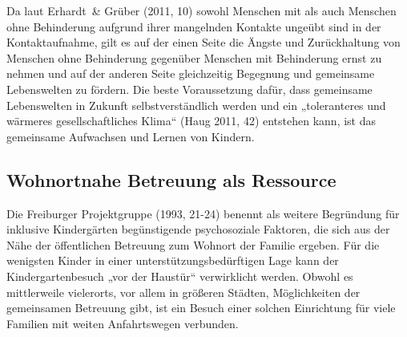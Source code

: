 Da laut Erhardt~\& Grüber (2011, 10) sowohl Menschen mit als auch Menschen ohne Behinderung aufgrund ihrer mangelnden Kontakte ungeübt sind in der Kontaktaufnahme, gilt es auf der einen Seite die Ängste und Zurückhaltung von Menschen ohne Behinderung gegenüber Menschen mit Behinderung ernst zu nehmen und auf der anderen Seite gleichzeitig Begegnung und gemeinsame Lebenswelten zu fördern. Die beste Voraussetzung dafür, dass gemeinsame Lebenswelten in Zukunft selbstverständlich werden und ein „toleranteres und wärmeres gesellschaftliches Klima“ (Haug 2011, 42) entstehen kann, ist das gemeinsame Aufwachsen und Lernen von Kindern. 

\subsection{Wohnortnahe Betreuung als Ressource}
Die Freiburger Projektgruppe (1993, 21-24) benennt als weitere Begründung für inklusive Kindergärten begünstigende psychosoziale Faktoren, die sich aus der Nähe der öffentlichen Betreuung zum Wohnort der Familie ergeben. Für die wenigsten Kinder in einer unterstützungsbedürftigen Lage kann der Kindergartenbesuch „vor der Haustür“ verwirklicht werden. Obwohl es mittlerweile vielerorts, vor allem in größeren Städten, Möglichkeiten der gemeinsamen Betreuung gibt, ist ein Besuch einer solchen Einrichtung für viele Familien mit weiten Anfahrtswegen verbunden. 

